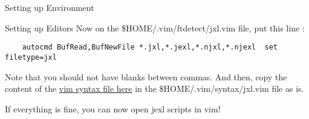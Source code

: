 \begin{section}{Setting up Environment}
\begin{subsection}{Setting up Editors}
Now on the \$HOME/.vim/ftdetect/jxl.vim  file, put this line :

\begin{lstlisting}
    autocmd BufRead,BufNewFile *.jxl,*.jexl,*.njxl,*.njexl  set filetype=jxl
\end{lstlisting}

Note that you should not have blanks between commas.
And then, copy the content of the \href{https://github.com/nmondal/njexl/blob/master/doc/jxl.vim}{vim syntax file here} 
in the \$HOME/.vim/syntax/jxl.vim file as is.

If everything is fine, you can now open jexl scripts in vim!

\end{subsection} 

\end{section}




